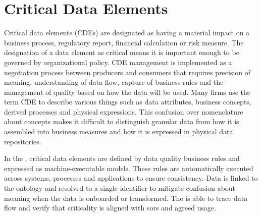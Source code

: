 \section{Critical Data Elements}\label{sec:ekgmm-b-4-5} %

Critical data elements (CDEs) are designated as having a material impact on a business process, regulatory report,
financial calculation or risk measure.
The designation of a data element as critical means it is important enough to be governed by organizational policy.
CDE management is implemented as a negotiation process between producers and consumers that requires
precision of meaning, understanding of data flow, capture of business rules and the management of quality based on
how the data will be used.
Many firms use the term CDE to describe various things such as data attributes, business concepts, derived processes
and physical expressions.
This confusion over nomenclature about concepts makes it difficult to distinguish granular data from how it is
assembled into business measures and how it is expressed in physical data repositories.

\ekgmmContextSection

In the ,
critical data elements are defined by data quality business rules and expressed as
machine-executable models.
These rules are automatically executed across systems, processes and applications to ensure consistency.
Data is linked to the ontology and resolved to a single identifier to mitigate confusion about meaning when the
data is onboarded or transformed.
The  is able to trace data flow and verify that criticality is aligned with \glspl{sor}
and agreed usage.

\kgmmcorequestionssection

